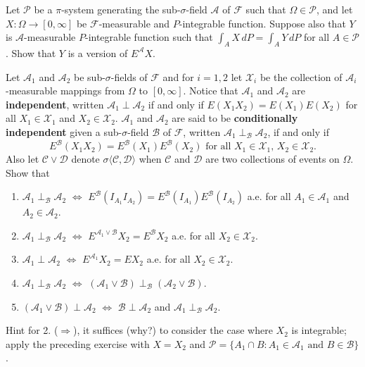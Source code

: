 \begin{exercise}
Let $\mathcal P$ be a $\pi$-system generating the sub-$\sigma$-field $\mathcal A$ of $\mathcal F$ such that $\Omega\in\mathcal P$, and let $X:\Omega \rightarrow [0,\infty]$ be $\mathcal F$-measurable and $P$-integrable function. Suppose also that $Y$ is $\mathcal A$-measurable  $P$-integrable function such that $\int_{A} X\, dP = \int_{A} Y\, dP$ for all $A\in \mathcal P$. Show that $Y$ is a version of $E^{\mathcal A} X$.
\end{exercise}

\begin{exercise}
Let $\mathcal A_1$ and $\mathcal A_2$ be sub-$\sigma$-fields of $\mathcal F$ and for $i = 1,2$ let $\mathcal X_i$ be the collection of $\mathcal A_i$-measurable mappings from $\Omega$ to $[0,\infty]$. Notice that $\mathcal A_1$ and $\mathcal A_2$ are {\bf independent}, written $\mathcal A_1 \perp \mathcal A_2$ if and only if $E(X_1X_2)=E(X_1)E(X_2)$ for all $X_1\in \mathcal X_1$ and $X_2\in \mathcal X_2$. $\mathcal A_1$ and $\mathcal A_2$ are said to be {\bf conditionally independent} given a sub-$\sigma$-field $\mathcal B$ of $\mathcal F$, written $\mathcal A_1 \perp_{\mathcal B} \mathcal A_2$, if and only if
\[
E^{\mathcal B}(X_1X_2) = E^{\mathcal B}(X_1) E^{\mathcal B}(X_2) \text{ for all $X_1\in\mathcal X_1$, $X_2\in\mathcal X_2$}.
\]
Also let $\mathcal C \vee \mathcal D$ denote $\sigma\langle \mathcal C, \mathcal D\rangle$ when $\mathcal C$ and $\mathcal D$ are two collections of events on $\Omega$.
Show that
\begin{enumerate}
\item  $\mathcal A_1 \perp_{\mathcal B} \mathcal A_2$ $\Longleftrightarrow$ $E^{\mathcal B}(I_{A_1}I_{A_2}) = E^{\mathcal B}(I_{A_1})E^{\mathcal B}(I_{A_2}) $ a.e.\! for all $A_1\in \mathcal A_1$ and $A_2\in \mathcal A_2$.
\item $\mathcal A_1 \perp_{\mathcal B} \mathcal A_2$ $\Longleftrightarrow$ $E^{\mathcal A_1 \vee \mathcal B}X_2 = E^{\mathcal B} X_2$ a.e.\! for all $X_2\in\mathcal X_2$.
\item $\mathcal A_1 \perp \mathcal A_2$ $\Longleftrightarrow$ $E^{\mathcal A_1 }X_2 = E X_2$ a.e.\! for all $X_2\in\mathcal X_2$.
\item $\mathcal A_1 \perp_{\mathcal B} \mathcal A_2$ $\Longleftrightarrow$ $( \mathcal A_1 \vee \mathcal B)\perp_{\mathcal B} (\mathcal A_2\vee \mathcal B)$.
\item $(\mathcal A_1 \vee \mathcal B) \perp \mathcal A_2$ $\Longleftrightarrow$ $\mathcal B\perp \mathcal A_2$ and $\mathcal A_1 \perp_{\mathcal B} \mathcal A_2$.
\end{enumerate}
Hint for {\small 2.}\! ($\Longrightarrow$), it suffices (why?) to consider the case where $X_2$ is integrable; apply the preceding exercise with $X=X_2$ and $\mathcal P = \{A_1\cap B\colon A_1\in \mathcal A_1 \text{ and } B\in \mathcal B \}$.
\end{exercise}


